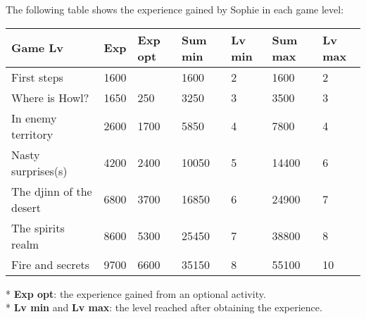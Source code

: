 The following table shows the experience gained by Sophie in each game level:
\begin{table}[H]
\centering
\begin{tabular}{|p{4cm}|l|l|l|l|l|l|}
\hline
\rowcolor[HTML]{C0C0C0} 
\textbf{Game Lv} & \textbf{Exp} & \textbf{Exp opt} & \textbf{Sum min} & \textbf{Lv min} & \textbf{Sum max} & \textbf{Lv max} \\ \hline
First steps & 1600 &  & 1600 & 2 & 1600 & 2 \\ \hline
Where is Howl? & 1650 & 250 & 3250 & 3 & 3500 & 3 \\ \hline
In enemy territory & 2600 & 1700 & 5850 & 4 & 7800 & 4 \\ \hline
Nasty surprises(s) & 4200 & 2400 & 10050 & 5 & 14400 & 6 \\ \hline
The djinn of the desert & 6800 & 3700 & 16850 & 6 & 24900 & 7 \\ \hline
The spirits realm & 8600 & 5300 & 25450 & 7 & 38800 & 8 \\ \hline
Fire and secrets & 9700 & 6600 & 35150 & 8 & 55100 & 10 \\ \hline
\end{tabular}
\end{table}
* \textbf{Exp opt}: the experience gained from an optional activity. \\
* \textbf{Lv min} and \textbf{Lv max}: the level reached after obtaining the experience.

